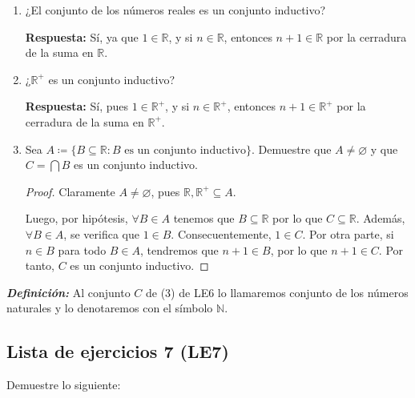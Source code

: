 \documentclass[11pt]{article}
\newcommand{\N}{\mathbb{N}}
\newcommand{\R}{\mathbb{R}}
\newcommand{\bfit}[1]{\textbf{\textit{#1}}}
\let\emptyset\varnothing
\begin{document}
\begin{enumerate}[label=\arabic*)]
    \item ¿El conjunto de los números reales es un conjunto inductivo?
    
    \textbf{Respuesta:} Sí, ya que $1 \in \R$, y si $n\in \R$, entonces $n+1 \in \R$ por la cerradura de la suma en $\R$.


    \item ¿$\R^+$ es un conjunto inductivo?
    
    \textbf{Respuesta:} Sí, pues $1\in \R^+$, y si $n\in \R^+$, entonces $n+1 \in \R^+$ por la cerradura de la suma en $\R^+$.

    \item Sea $A\coloneqq \{B \subseteq \R: B \text{ es un conjunto inductivo}\}$. Demuestre que $A\neq \emptyset$ y que $C=\bigcap B$ es un conjunto inductivo.
    
    \vspace{-1em}\begin{proof} 
    Claramente $A \neq \emptyset$, pues $\R, \R^+ \subseteq A$.
    
    Luego, por hipótesis, $\forall B \in A$ tenemos que $B\subseteq \R $ por lo que $C\subseteq \R$. Además, $\forall B\in A$, se verifica que $1\in B$. Consecuentemente, $1\in C$. Por otra parte, si $n\in B$ para todo $B\in A$, tendremos que $n+1\in B$, por lo que $n+1 \in C$. Por tanto, $C$ es un conjunto inductivo.
    \end{proof} \vspace{-1em}
\end{enumerate}

\bfit{Definición:}  Al conjunto $C$ de (3) de LE6 lo llamaremos conjunto de los números naturales y lo denotaremos con el símbolo $\N$.

\subsection*{Lista de ejercicios 7 (LE7)}

Demuestre lo siguiente:
\end{document}
